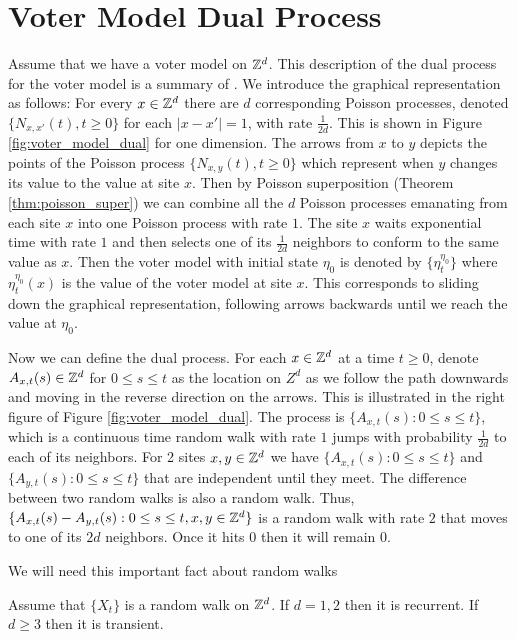 \section{Voter Model Dual Process}

Assume that we have a voter model on $\mathbb{Z}^d$.
This description of the dual process for the voter model is a summary of \cite{Liggett1999}.
We introduce the graphical representation as follows: For every $x \in \mathbb{Z}^d$ there are $d$ corresponding Poisson processes, denoted $\{N_{x,x'}(t), t \geq 0\}$ for each $|x - x'| = 1$, with rate $\frac{1}{2d}$.
This is shown in Figure \ref{fig:voter_model_dual} for one dimension.
The arrows from $x$ to $y$ depicts the points of the Poisson process $\{N_{x,y}(t), t \geq 0\}$ which represent when $y$ changes its value to the value at site $x$.
Then by Poisson superposition (Theorem \ref{thm:poisson_super}) we can combine all the $d$ Poisson processes emanating from each site $x$ into one Poisson process with rate $1$.
The site $x$ waits exponential time with rate $1$ and then selects one of its $\frac{1}{2d}$ neighbors to conform to the same value as $x$.
Then the voter model with initial state $\eta_0$ is denoted by $\{\eta_t^{\eta_0}\}$ where $\eta_t^{\eta_0}(x)$ is the value of the voter model at site $x$.
This corresponds to sliding down the graphical representation, following arrows backwards until we reach the value at $\eta_0$.

Now we can define the dual process.
For each $x \in \mathbb{Z}^d$ at a time $t \geq 0$,
denote $A_{x,t}(s) \in \mathbb{Z}^d$ for $0 \leq s \leq t$ as the location on $Z^d$ as we follow the path downwards and moving in the reverse direction on the arrows. This is illustrated in the right figure of Figure \ref{fig:voter_model_dual}.
The process is $\{A_{x,t}(s) : 0 \leq s \leq t\}$, which is a continuous time random walk with rate $1$ jumps with probability $\frac{1}{2d}$ to each of its neighbors.
For 2 sites $x, y \in \mathbb{Z}^d$ we have
$\{A_{x,t}(s) : 0 \leq s \leq t\}$ and $\{A_{y,t}(s) : 0 \leq s \leq t\}$ that are independent until they meet.
The difference between two random walks is also a random walk.
Thus, $\{A_{x,t}(s) - A_{y,t}(s) : 0 \leq s \leq t, x,y \in \mathbb{Z}^d\}$ is a random walk with rate $2$ that moves to one of its $2d$ neighbors.
Once it hits 0 then it will remain 0.

We will need this important fact about random walks

\begin{theorem} \label{thm:rw_recurrent}
Assume that $\{X_t\}$ is a random walk on $\mathbb{Z}^d$.
If $d = 1,2$ then it is recurrent.
If $d \geq 3$ then it is transient.
\end{theorem}

